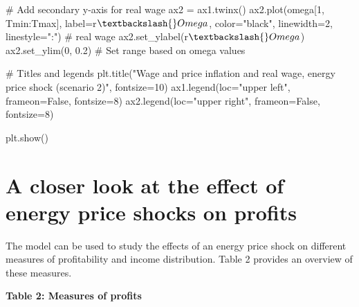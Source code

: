 \documentclass[
  letterpaper,
  DIV=11,
  numbers=noendperiod]{scrreprt}
\newenvironment{Shaded}{\begin{snugshade}}{\end{snugshade}}
\newcommand{\CommentTok}[1]{\textcolor[rgb]{0.37,0.37,0.37}{#1}}
\newcommand{\DecValTok}[1]{\textcolor[rgb]{0.68,0.00,0.00}{#1}}
\newcommand{\FloatTok}[1]{\textcolor[rgb]{0.68,0.00,0.00}{#1}}
\newcommand{\NormalTok}[1]{\textcolor[rgb]{0.00,0.23,0.31}{#1}}
\newcommand{\OperatorTok}[1]{\textcolor[rgb]{0.37,0.37,0.37}{#1}}
\newcommand{\StringTok}[1]{\textcolor[rgb]{0.13,0.47,0.30}{#1}}
\newcommand{\VariableTok}[1]{\textcolor[rgb]{0.07,0.07,0.07}{#1}}
\newcommand{\VerbatimStringTok}[1]{\textcolor[rgb]{0.13,0.47,0.30}{#1}}
\begin{document}
\begin{tcolorbox}
\begin{Shaded}
\begin{Highlighting}[]
\CommentTok{\# Add secondary y{-}axis for real wage}
\NormalTok{ax2 }\OperatorTok{=}\NormalTok{ ax1.twinx()}
\NormalTok{ax2.plot(omega[}\DecValTok{1}\NormalTok{, Tmin:Tmax], label}\OperatorTok{=}\VerbatimStringTok{r\textquotesingle{}$\textbackslash{}Omega$\textquotesingle{}}\NormalTok{, color}\OperatorTok{=}\StringTok{"black"}\NormalTok{, linewidth}\OperatorTok{=}\DecValTok{2}\NormalTok{, linestyle}\OperatorTok{=}\StringTok{":"}\NormalTok{)  }\CommentTok{\# real wage}
\NormalTok{ax2.set\_ylabel(}\VerbatimStringTok{r\textquotesingle{}$\textbackslash{}Omega$\textquotesingle{}}\NormalTok{)}
\NormalTok{ax2.set\_ylim(}\DecValTok{0}\NormalTok{, }\FloatTok{0.2}\NormalTok{)  }\CommentTok{\# Set range based on omega values}

\CommentTok{\# Titles and legends}
\NormalTok{plt.title(}\StringTok{"Wage and price inflation and real wage, energy price shock (scenario 2)"}\NormalTok{, fontsize}\OperatorTok{=}\DecValTok{10}\NormalTok{)}
\NormalTok{ax1.legend(loc}\OperatorTok{=}\StringTok{"upper left"}\NormalTok{, frameon}\OperatorTok{=}\VariableTok{False}\NormalTok{, fontsize}\OperatorTok{=}\DecValTok{8}\NormalTok{)}
\NormalTok{ax2.legend(loc}\OperatorTok{=}\StringTok{"upper right"}\NormalTok{, frameon}\OperatorTok{=}\VariableTok{False}\NormalTok{, fontsize}\OperatorTok{=}\DecValTok{8}\NormalTok{)}

\NormalTok{plt.show()}
\end{Highlighting}
\end{Shaded}

\end{tcolorbox}

\section{A closer look at the effect of energy price shocks on
profits}\label{a-closer-look-at-the-effect-of-energy-price-shocks-on-profits}

The model can be used to study the effects of an energy price shock on
different measures of profitability and income distribution. Table 2
provides an overview of these measures.

\textbf{Table 2: Measures of profits}
\end{document}
